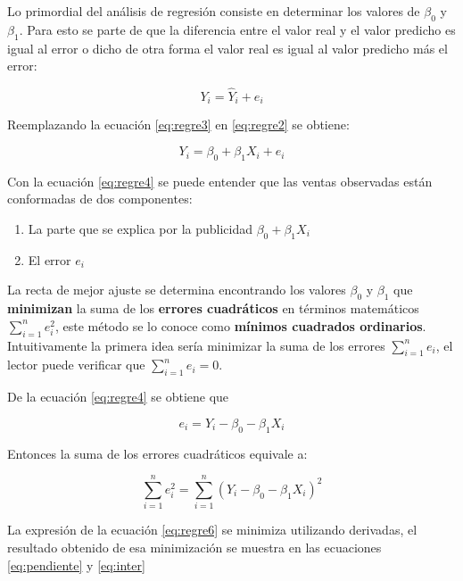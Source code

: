 \documentclass[
]{krantz}
\providecommand{\tightlist}{%
  \setlength{\itemsep}{0pt}\setlength{\parskip}{0pt}}
\begin{document}
Lo primordial del análisis de regresión consiste en determinar los valores de \(\beta_0\) y \(\beta_1\). Para esto se parte de que la diferencia entre el valor real y el valor predicho es igual al error o dicho de otra forma el valor real es igual al valor predicho más el error:

\begin{equation}
Y_i=\hat{Y}_i+e_i 
    \label{eq:regre3}
\end{equation}

Reemplazando la ecuación \eqref{eq:regre3} en \eqref{eq:regre2} se obtiene:

\begin{equation}
Y_i=\beta_0 + \beta_1 X_i+e_i 
    \label{eq:regre4}
\end{equation}

Con la ecuación \eqref{eq:regre4} se puede entender que las ventas observadas están conformadas de dos componentes:

\begin{enumerate}
\def\labelenumi{\arabic{enumi}.}
\tightlist
\item
  La parte que se explica por la publicidad \(\beta_0 + \beta_1 X_i\)
\item
  El error \(e_i\)
\end{enumerate}

La recta de mejor ajuste se determina encontrando los valores \(\beta_0\) y \(\beta_1\) que \textbf{minimizan} la suma de los \textbf{errores cuadráticos} en términos matemáticos \(\sum_{i=1}^{n}{e_i^2}\), este método se lo conoce como \textbf{mínimos cuadrados ordinarios}. Intuitivamente la primera idea sería minimizar la suma de los errores \(\sum_{i=1}^{n}{e_i}\), el lector puede verificar que \(\sum_{i=1}^{n}{e_i}=0\).

De la ecuación \eqref{eq:regre4} se obtiene que

\begin{equation}
e_i = Y_i-\beta_0 - \beta_1 X_i
    \label{eq:regre5}
\end{equation}

Entonces la suma de los errores cuadráticos equivale a:

\begin{equation}
\sum_{i=1}^{n}{e_i^2} = \sum_{i=1}^{n}{\left(Y_i-\beta_0 - \beta_1 X_i\right)^2}
    \label{eq:regre6}
\end{equation}

La expresión de la ecuación \eqref{eq:regre6} se minimiza utilizando derivadas, el resultado obtenido de esa minimización se muestra en las ecuaciones \eqref{eq:pendiente} y \eqref{eq:inter}
\end{document}
